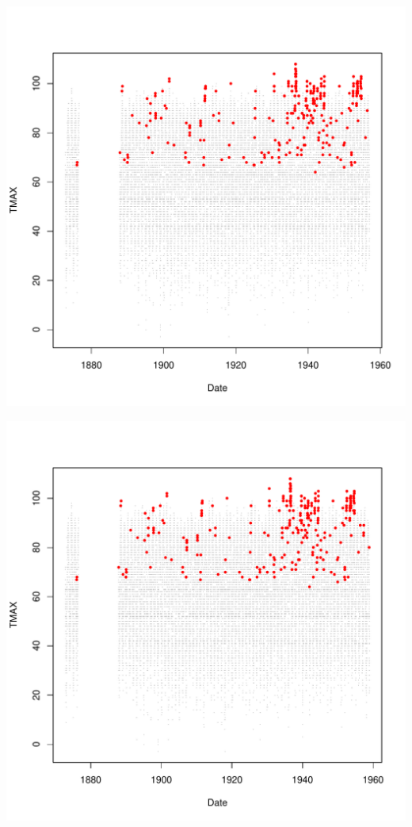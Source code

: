 \documentclass{article}\usepackage[]{graphicx}\usepackage[]{color}
\makeatletter
\def\maxwidth{ %
  \ifdim\Gin@nat@width>\linewidth
    \linewidth
  \else
    \Gin@nat@width
  \fi
}
\newenvironment{knitrout}{}{} %
\makeatother
\begin{document}
\begin{knitrout}
\includegraphics[width=\maxwidth]{figure/unnamed-chunk-4-38} 

\includegraphics[width=\maxwidth]{figure/unnamed-chunk-4-39} 


\end{knitrout}
\end{document}
